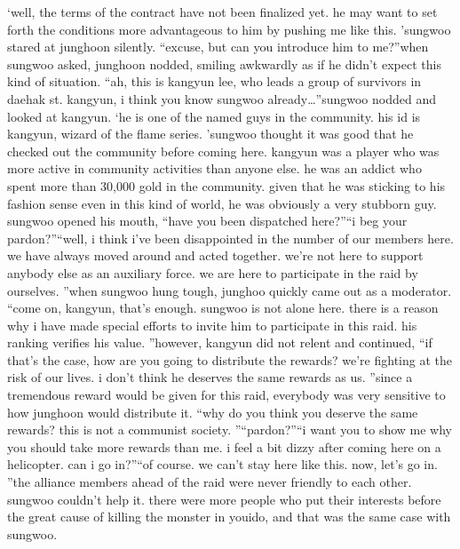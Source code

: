 ‘well, the terms of the contract have not been finalized yet.
 he may want to set forth the conditions more advantageous to him by pushing me like this.
’sungwoo stared at junghoon silently.
“excuse, but can you introduce him to me?”when sungwoo asked, junghoon nodded, smiling awkwardly as if he didn’t expect this kind of situation.
“ah, this is kangyun lee, who leads a group of survivors in daehak st.
 kangyun, i think you know sungwoo already…”sungwoo nodded and looked at kangyun.
‘he is one of the named guys in the community.
 his id is kangyun, wizard of the flame series.
’sungwoo thought it was good that he checked out the community before coming here.
 kangyun was a player who was more active in community activities than anyone else.
 he was an addict who spent more than 30,000 gold in the community.
given that he was sticking to his fashion sense even in this kind of world, he was obviously a very stubborn guy.
sungwoo opened his mouth, “have you been dispatched here?”“i beg your pardon?”“well, i think i’ve been disappointed in the number of our members here.
 we have always moved around and acted together.
 we’re not here to support anybody else as an auxiliary force.
 we are here to participate in the raid by ourselves.
”when sungwoo hung tough, junghoo quickly came out as a moderator.
“come on, kangyun, that’s enough.
 sungwoo is not alone here.
 there is a reason why i have made special efforts to invite him to participate in this raid.
 his ranking verifies his value.
”however, kangyun did not relent and continued, “if that’s the case, how are you going to distribute the rewards? we’re fighting at the risk of our lives.
 i don’t think he deserves the same rewards as us.
”since a tremendous reward would be given for this raid, everybody was very sensitive to how junghoon would distribute it.
“why do you think you deserve the same rewards? this is not a communist society.
”“pardon?”“i want you to show me why you should take more rewards than me.
 i feel a bit dizzy after coming here on a helicopter.
 can i go in?”“of course.
 we can’t stay here like this.
 now, let’s go in.
”the alliance members ahead of the raid were never friendly to each other.
 sungwoo couldn’t help it.
 there were more people who put their interests before the great cause of killing the monster in youido, and that was the same case with sungwoo.


